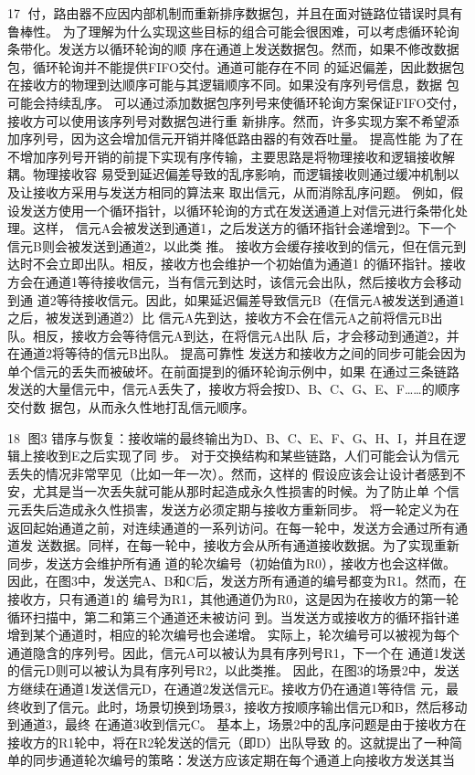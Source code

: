                                                    17
付，路由器不应因内部机制而重新排序数据包，并且在面对链路位错误时具有鲁棒性。
为了理解为什么实现这些目标的组合可能会很困难，可以考虑循环轮询条带化。发送方以循环轮询的顺
序在通道上发送数据包。然而，如果不修改数据包，循环轮询并不能提供FIFO交付。通道可能存在不同
的延迟偏差，因此数据包在接收方的物理到达顺序可能与其逻辑顺序不同。如果没有序列号信息，数据
包可能会持续乱序。
可以通过添加数据包序列号来使循环轮询方案保证FIFO交付，接收方可以使用该序列号对数据包进行重
新排序。然而，许多实现方案不希望添加序列号，因为这会增加信元开销并降低路由器的有效吞吐量。
提高性能
为了在不增加序列号开销的前提下实现有序传输，主要思路是将物理接收和逻辑接收解耦。物理接收容
易受到延迟偏差导致的乱序影响，而逻辑接收则通过缓冲机制以及让接收方采用与发送方相同的算法来
取出信元，从而消除乱序问题。
例如，假设发送方使用一个循环指针，以循环轮询的方式在发送通道上对信元进行条带化处理。这样，
信元A会被发送到通道1，之后发送方的循环指针会递增到2。下一个信元B则会被发送到通道2，以此类
推。
接收方会缓存接收到的信元，但在信元到达时不会立即出队。相反，接收方也会维护一个初始值为通道1
的循环指针。接收方会在通道1等待接收信元，当有信元到达时，该信元会出队，然后接收方会移动到通
道2等待接收信元。因此，如果延迟偏差导致信元B（在信元A被发送到通道1之后，被发送到通道2）比
信元A先到达，接收方不会在信元A之前将信元B出队。相反，接收方会等待信元A到达，在将信元A出队
后，才会移动到通道2，并在通道2将等待的信元B出队。
提高可靠性
发送方和接收方之间的同步可能会因为单个信元的丢失而被破坏。在前面提到的循环轮询示例中，如果
在通过三条链路发送的大量信元中，信元A丢失了，接收方将会按D、B、C、G、E、F……的顺序交付数
据包，从而永久性地打乱信元顺序。




                                               18
图3 错序与恢复：接收端的最终输出为D、B、C、E、F、G、H、I，并且在逻辑上接收到E之后实现了同
步。
对于交换结构和某些链路，人们可能会认为信元丢失的情况非常罕见（比如一年一次）。然而，这样的
假设应该会让设计者感到不安，尤其是当一次丢失就可能从那时起造成永久性损害的时候。为了防止单
个信元丢失后造成永久性损害，发送方必须定期与接收方重新同步。
将一轮定义为在返回起始通道之前，对连续通道的一系列访问。在每一轮中，发送方会通过所有通道发
送数据。同样，在每一轮中，接收方会从所有通道接收数据。为了实现重新同步，发送方会维护所有通
道的轮次编号（初始值为R0），接收方也会这样做。
因此，在图3中，发送完A、B和C后，发送方所有通道的编号都变为R1。然而，在接收方，只有通道1的
编号为R1，其他通道仍为R0，这是因为在接收方的第一轮循环扫描中，第二和第三个通道还未被访问
到。当发送方或接收方的循环指针递增到某个通道时，相应的轮次编号也会递增。
实际上，轮次编号可以被视为每个通道隐含的序列号。因此，信元A可以被认为具有序列号R1，下一个在
通道1发送的信元D则可以被认为具有序列号R2，以此类推。
因此，在图3的场景2中，发送方继续在通道1发送信元D，在通道2发送信元E。接收方仍在通道1等待信
元，最终收到了信元。此时，场景切换到场景3，接收方按顺序输出信元D和B，然后移动到通道3，最终
在通道3收到信元C。
基本上，场景2中的乱序问题是由于接收方在接收方的R1轮中，将在R2轮发送的信元（即D）出队导致
的。这就提出了一种简单的同步通道轮次编号的策略：发送方应该定期在每个通道上向接收方发送其当

